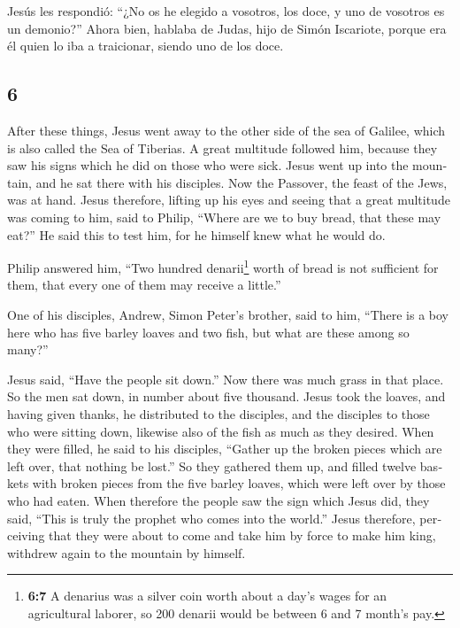 \begin{paracol}{2}
 Jesús les respondió: ``¿No os he elegido a vosotros, los
doce, y uno de vosotros es un demonio?''  Ahora bien,
hablaba de Judas, hijo de Simón Iscariote, porque era él quien lo iba a
traicionar, siendo uno de los doce.

\switchcolumn
\begin{otherlanguage}{english}

\hypertarget{section-11}{%
\section{6}\label{section-11}}

 After these things, Jesus went away to the other side of
the sea of Galilee, which is also called the Sea of Tiberias.
 A great multitude followed him, because they saw his
signs which he did on those who were sick.  Jesus went up
into the mountain, and he sat there with his disciples. 
Now the Passover, the feast of the Jews, was at hand. 
Jesus therefore, lifting up his eyes and seeing that a great multitude
was coming to him, said to Philip, ``Where are we to buy bread, that
these may eat?''  He said this to test him, for he himself
knew what he would do.

 Philip answered him, ``Two hundred denarii\footnote{\textbf{6:7}
  A denarius was a silver coin worth about a day's wages for an
  agricultural laborer, so 200 denarii would be between 6 and 7 month's
  pay.} worth of bread is not sufficient for them, that every one of
them may receive a little.''

 One of his disciples, Andrew, Simon Peter's brother, said
to him,  ``There is a boy here who has five barley loaves
and two fish, but what are these among so many?''

 Jesus said, ``Have the people sit down.'' Now there was
much grass in that place. So the men sat down, in number about five
thousand.  Jesus took the loaves, and having given
thanks, he distributed to the disciples, and the disciples to those who
were sitting down, likewise also of the fish as much as they desired.
 When they were filled, he said to his disciples,
``Gather up the broken pieces which are left over, that nothing be
lost.''  So they gathered them up, and filled twelve
baskets with broken pieces from the five barley loaves, which were left
over by those who had eaten.  When therefore the people
saw the sign which Jesus did, they said, ``This is truly the prophet who
comes into the world.''  Jesus therefore, perceiving that
they were about to come and take him by force to make him king, withdrew
again to the mountain by himself.


\end{otherlanguage}
\end{paracol}
